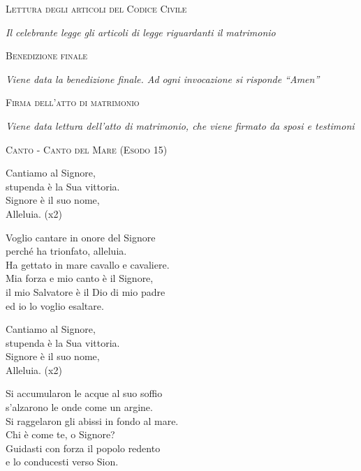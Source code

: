 \documentclass[12pt,twoside]{article}
\newcommand{\masssubpart}[1]{\bigskip

  {\large\scshape #1}}
\newcommand{\note}[1]{{\centering \textit{#1}}}
\begin{document}
\masssubpart{Lettura degli articoli del Codice Civile}

\note{Il celebrante legge gli articoli di legge riguardanti il matrimonio}

\masssubpart{Benedizione finale}

\note{Viene data la benedizione finale. Ad ogni invocazione si risponde ``Amen''}

\masssubpart{Firma dell'atto di matrimonio}

\note{Viene data lettura dell'atto di matrimonio, che viene firmato da sposi e testimoni}

\newpage

\masssubpart{Canto - Canto del Mare (Esodo 15)}

Cantiamo al Signore,\\
stupenda è la Sua vittoria.\\
Signore è il suo nome,\\
Alleluia. (x2)

Voglio cantare in onore del Signore\\
perché ha trionfato, alleluia.\\
Ha gettato in mare cavallo e cavaliere.\\
Mia forza e mio canto è il Signore,\\
il mio Salvatore è il Dio di mio padre\\
ed io lo voglio esaltare.

Cantiamo al Signore,\\
stupenda è la Sua vittoria.\\
Signore è il suo nome,\\
Alleluia. (x2)

Si accumularon le acque al suo soffio\\
s'alzarono le onde come un argine.\\
Si raggelaron gli abissi in fondo al mare.\\
Chi è come te, o Signore?\\
Guidasti con forza il popolo redento\\
e lo conducesti verso Sion.


\newpage
\null

\newpage
\null
\end{document}
